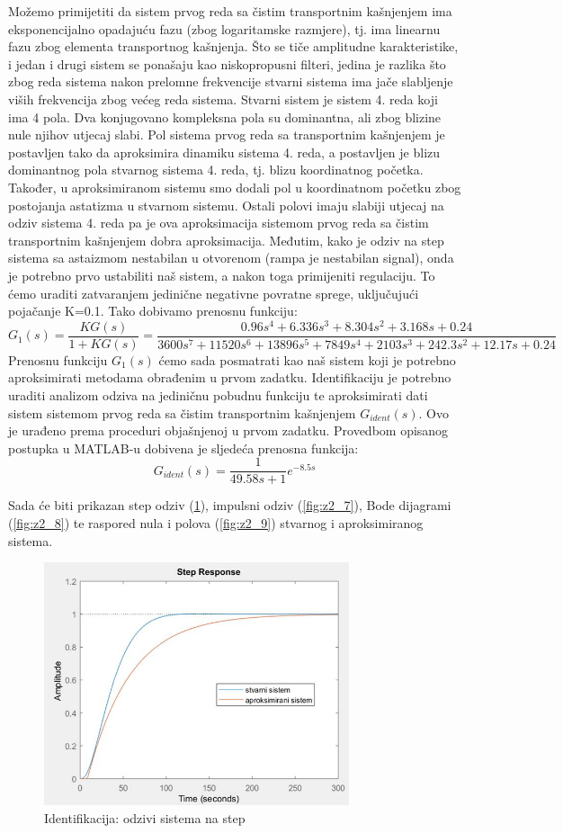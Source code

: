 Možemo primijetiti da sistem prvog reda sa čistim transportnim kašnjenjem ima eksponencijalno opadajuću fazu (zbog logaritamske razmjere), tj. ima linearnu fazu zbog elementa transportnog kašnjenja. Što se tiče amplitudne karakteristike, i jedan i drugi sistem se ponašaju kao niskopropusni filteri, jedina je razlika što zbog reda sistema nakon prelomne frekvencije stvarni sistema ima jače slabljenje viših frekvencija zbog većeg reda sistema. Stvarni sistem je sistem 4. reda koji ima 4 pola. Dva konjugovano kompleksna pola su dominantna, ali zbog blizine nule njihov utjecaj slabi. Pol sistema prvog reda sa transportnim kašnjenjem je postavljen tako da aproksimira dinamiku sistema 4. reda, a postavljen je blizu dominantnog pola stvarnog sistema 4. reda, tj. blizu koordinatnog početka. Također, u aproksimiranom sistemu smo dodali pol u koordinatnom početku zbog postojanja astatizma u stvarnom sistemu. Ostali polovi imaju slabiji utjecaj na odziv sistema 4. reda pa je ova aproksimacija sistemom prvog reda sa čistim transportnim kašnjenjem dobra aproksimacija. Međutim, kako je odziv na step sistema sa astaizmom nestabilan u otvorenom (rampa je nestabilan signal), onda je potrebno prvo ustabiliti naš sistem, a nakon toga primijeniti regulaciju. To ćemo uraditi zatvaranjem jedinične negativne povratne sprege, uključujući pojačanje K=0.1. Tako dobivamo prenosnu funkciju:
	\[G_1 (s)=\frac{KG(s)}{1+KG(s)} =\frac{0.96s^4+6.336s^3+8.304s^2+3.168s+0.24}{3600s^7+11520s^6+13896s^5+7849s^4+2103s^3+242.3s^2+12.17s+0.24}\]
Prenosnu funkciju $G_1 (s)$ ćemo sada posmatrati kao naš sistem koji je potrebno aproksimirati metodama obrađenim u prvom zadatku. Identifikaciju je potrebno uraditi analizom odziva na jediničnu pobudnu funkciju te aproksimirati dati sistem sistemom prvog reda sa čistim transportnim kašnjenjem $G_{ident} (s)$. Ovo je urađeno prema proceduri objašnjenoj u prvom zadatku. Provedbom opisanog postupka u MATLAB-u dobivena je sljedeća prenosna funkcija:
	\[G_{ident} (s)=\frac{1}{49.58s+1} e^{-8.5s}\]

Sada će biti prikazan step odziv (\ref{fig:z2_6}), impulsni odziv (\ref{fig:z2_7}), Bode dijagrami (\ref{fig:z2_8}) te raspored nula i polova (\ref{fig:z2_9}) stvarnog i aproksimiranog sistema.

\begin{figure} [H]
  \centering
  \includegraphics[width=0.8\textwidth]{z2_6}
  \caption{Identifikacija: odzivi sistema na step}
  \label{fig:z2_6}
\end{figure}

